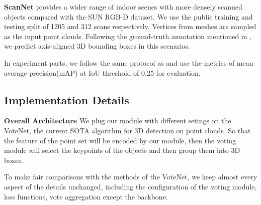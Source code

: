 \documentclass[runningheads]{llncs}
\begin{document}
\textbf{ScanNet} \cite{SCannet} provides a wider range of indoor scenes with more densely scanned objects compared with the SUN RGB-D dataset. We use the public training and testing split of 1205 and 312 scans respectively. Vertices from meshes are sampled as the input point clouds. Following the ground-truth annotation mentioned in \cite{VoteNet}, we predict axis-aligned 3D bounding boxes in this scenarios.

In experiment parts, we follow the same protocol as \cite{VoteNet} and use the metrics of mean average precision(mAP) at IoU threshold of 0.25 for evaluation.

\subsection{Implementation Details} 
\noindent\textbf{Overall Architecture}
We  plug our module with different setings on the VoteNet\cite{VoteNet}, the current SOTA algorithm for 3D detection on point clouds .So that the feature of the point set will be encoded by our module, then the voting module\cite{VoteNet} will select the keypoints of the objects and then group them into 3D boxes.

To make fair comparisons with the methods of the VoteNet\cite{VoteNet}, we keep almost every aspect of the details unchanged, including the configuration of the voting module, loss functions, vote aggregation  except the backbone. 

 

\end{document}

